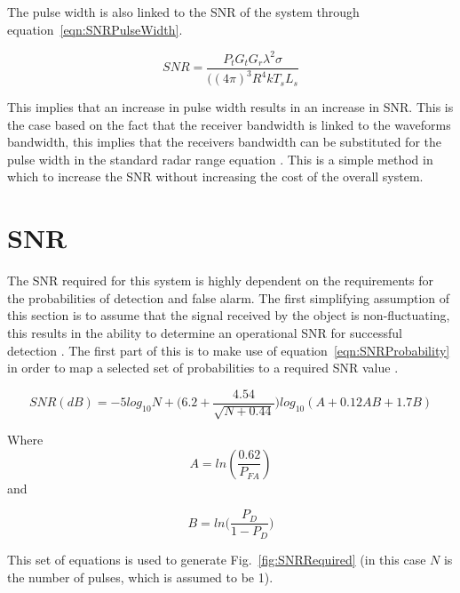 \documentclass[11pt]{witseiepaper}
\begin{document}
The pulse width is also linked to the SNR of the system through equation~\ref{eqn:SNRPulseWidth}.

\begin{equation} \label{eqn:SNRPulseWidth}
SNR = \frac{P_{t} G_t G_r {\lambda^2} \sigma}{((4 \pi )^3 R^4 k T_s L_s}
\end{equation}

This implies that an increase in pulse width results in an increase in SNR. This is the case based on the fact that the receiver bandwidth is linked to the waveforms bandwidth, this implies that the receivers bandwidth can be substituted for the pulse width in the standard radar range equation \cite[p.~776]{radarHandbook}.
This is a simple method in which to increase the SNR without increasing the cost of the overall system.



\section{SNR} \label{sec:SNR}
The SNR required for this system is highly dependent on the requirements for the probabilities of detection and false alarm. The first simplifying assumption of this section is to assume that the signal received by the object is non-fluctuating, this results in the ability to determine an operational SNR for successful detection \cite[p.~102-103]{radarHandbook}.
The first part of this is to make use of equation~\ref{eqn:SNRProbability} in order to map a selected set of probabilities to a required SNR value \cite[p.~107]{radarHandbook}.

\begin{equation} \label{eqn:SNRProbability}
SNR (dB) = -5 log_{10}N + \Bigg(6.2 + \frac{4.54}{\sqrt{N + 0.44}}\Bigg) log_{10}(A + 0.12 A B + 1.7 B)
\end{equation}

Where 
\begin{equation} \label{eqn:A}
A = ln(\frac{0.62}{P_{FA}})
\end{equation}
and 

\begin{equation} \label{eqn:B}
B = ln \Bigg( \frac{P_D}{1 - P_D} \Bigg)
\end{equation}

This set of equations is used to generate Fig.~\ref{fig:SNRRequired} (in this case $N$ is the number of pulses, which is assumed to be 1).
\end{document}
